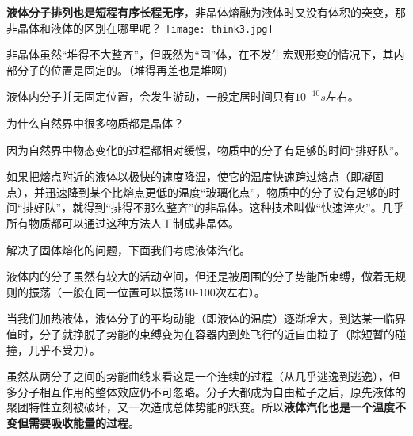 \documentclass[CJK]{beamer}
\begin{document}
\begin{frame}
\bch
{\bf 液体分子排列也是短程有序长程无序}，非晶体熔融为液体时又没有体积的突变，那非晶体和液体的区别在哪里呢？
\bcenter
\texttt{[image: think3.jpg]}
\ecenter
\ech
\end{frame}

\begin{frame}
\bch
\bitem
\item{非晶体虽然“堆得不大整齐”，但既然为“固”体，在不发生宏观形变的情况下，其内部分子的位置是固定的。（堆得再差也是堆啊\wulian)}
\item{液体内分子并无固定位置，会发生游动，一般定居时间只有$10^{-10}s$左右。}
\eitem
\ech
\end{frame}

\begin{frame}
\bch
为什么自然界中很多物质都是晶体？

\skipline

因为自然界中物态变化的过程都相对缓慢，物质中的分子有足够的时间“排好队”。

\skipline

如果把熔点附近的液体以极快的速度降温，使它的温度快速跨过熔点（即凝固点），并迅速降到某个比熔点更低的温度“玻璃化点”，物质中的分子没有足够的时间“排好队”，就得到“排得不那么整齐”的非晶体。这种技术叫做“快速淬火”。几乎所有物质都可以通过这种方法人工制成非晶体。

\ech

\end{frame}


\begin{frame}
\bch
解决了固体熔化的问题，下面我们考虑液体汽化。
\ech
\end{frame}

\begin{frame}
\bch
\bitem
\item{液体内的分子虽然有较大的活动空间，但还是被周围的分子势能所束缚，做着无规则的振荡（一般在同一位置可以振荡10-100次左右）。}
\item{当我们加热液体，液体分子的平均动能（即液体的温度）逐渐增大，到达某一临界值时，分子就挣脱了势能的束缚变为在容器内到处飞行的近自由粒子（除短暂的碰撞，几乎不受力）。}
\item{虽然从两分子之间的势能曲线来看这是一个连续的过程（从几乎逃逸到逃逸），但多分子相互作用的整体效应仍不可忽略。分子大都成为自由粒子之后，原先液体的聚团特性立刻被破坏，又一次造成总体势能的跃变。所以{\bf 液体汽化也是一个温度不变但需要吸收能量的过程}。}
\eitem
\ech
\end{frame}
\end{document}
